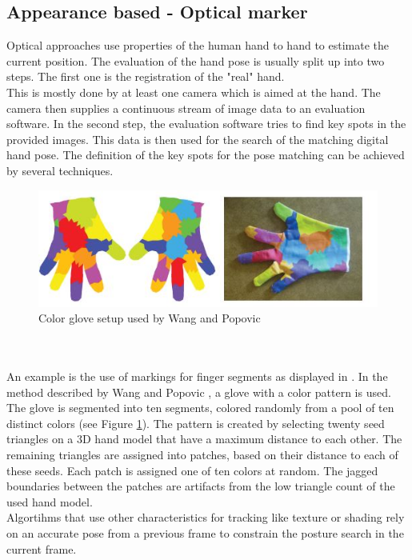 \subsection{Appearance based - Optical marker}
\label{Appearance Based Optical marker}
Optical approaches use properties of the human hand to hand to estimate the current position. The evaluation of the hand pose is usually split up into two steps. The first one is the registration of the "real" hand.\\
This is mostly done by at least one camera which is aimed at the hand. The camera then supplies a continuous stream of image data to an evaluation software. In the second step, the evaluation software tries to find key spots in the provided images. This data is then used for the search of the matching digital hand pose. The definition of the key spots for the pose matching can be achieved by several techniques.
\begin{figure}
\includegraphics[width=\textwidth]{images/wang_color_glove.JPG}
\caption{Color glove setup used by Wang and Popovic  \cite{Wang.2009} }
\label{wang color glove}
\end{figure}
\\\\An example is the use of markings for finger segments as displayed in \cite{Duca.2007,Fredriksson.2008,Wang.2009}.
In the method described by Wang and Popovic \cite{Wang.2009}, a glove with a color pattern is used. The glove is segmented into ten segments, colored randomly from a pool of ten distinct colors (see Figure \ref{wang color glove}). The pattern is created by selecting twenty seed triangles on a 3D hand model that have a maximum distance to each other. The remaining triangles are assigned into patches, based on their distance to each of these seeds. Each patch is assigned one of ten colors at random. The jagged boundaries between the patches are artifacts from the low triangle count of the used hand model.
\\Algortihms that use other characteristics for tracking like texture or shading \cite{LaGorce.2008} rely on an accurate pose from a previous frame to constrain the posture search in the current frame.
